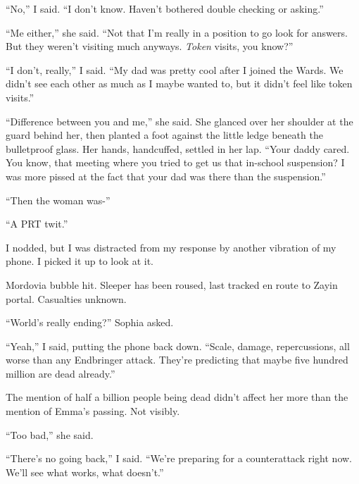 ``No,'' I said.  ``I don't know.  Haven't bothered double checking or asking.''



``Me either,'' she said.  ``Not that I'm really in a position to go look for answers.  But they weren't visiting much anyways.  \emph{Token} visits, you know?''



``I don't, really,'' I said.  ``My dad was pretty cool after I joined the Wards.  We didn't see each other as much as I maybe wanted to, but it didn't feel like token visits.''



``Difference between you and me,'' she said.  She glanced over her shoulder at the guard behind her, then planted a foot against the little ledge beneath the bulletproof glass.  Her hands, handcuffed, settled in her lap.  ``Your daddy cared.  You know, that meeting where you tried to get us that in-school suspension?  I was more pissed at the fact that your dad was there than the suspension.''



``Then the woman was-''



``A PRT twit.''



I nodded, but I was distracted from my response by another vibration of my phone.  I picked it up to look at it.



Mordovia bubble hit.  Sleeper has been roused, last tracked en route to Zayin portal.  Casualties unknown.



``World's really ending?''  Sophia asked.



``Yeah,'' I said, putting the phone back down.  ``Scale, damage, repercussions, all worse than any Endbringer attack.  They're predicting that maybe five hundred million are dead already.''



The mention of half a billion people being dead didn't affect her more than the mention of Emma's passing.  Not visibly.



``Too bad,'' she said.



``There's no going back,'' I said.  ``We're preparing for a counterattack right now.  We'll see what works, what doesn't.''



